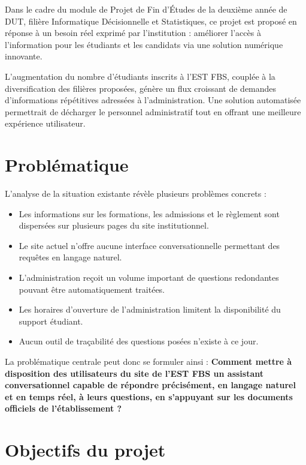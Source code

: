 \documentclass[12pt, a4paper, twoside]{report}
\begin{document}
Dans le cadre du module de Projet de Fin d'Études de la deuxième année de DUT, filière Informatique Décisionnelle et Statistiques, ce projet est proposé en réponse à un besoin réel exprimé par l'institution : améliorer l'accès à l'information pour les étudiants et les candidats via une solution numérique innovante.

L'augmentation du nombre d'étudiants inscrits à l'EST FBS, couplée à la diversification des filières proposées, génère un flux croissant de demandes d'informations répétitives adressées à l'administration. Une solution automatisée permettrait de décharger le personnel administratif tout en offrant une meilleure expérience utilisateur.

\section{Problématique}

L'analyse de la situation existante révèle plusieurs problèmes concrets :

\begin{infobox}
\begin{itemize}
  \item Les informations sur les formations, les admissions et le règlement sont dispersées sur plusieurs pages du site institutionnel.
  \item Le site actuel n'offre aucune interface conversationnelle permettant des requêtes en langage naturel.
  \item L'administration reçoit un volume important de questions redondantes pouvant être automatiquement traitées.
  \item Les horaires d'ouverture de l'administration limitent la disponibilité du support étudiant.
  \item Aucun outil de traçabilité des questions posées n'existe à ce jour.
\end{itemize}
\end{infobox}

La problématique centrale peut donc se formuler ainsi : \textbf{Comment mettre à disposition des utilisateurs du site de l'EST FBS un assistant conversationnel capable de répondre précisément, en langage naturel et en temps réel, à leurs questions, en s'appuyant sur les documents officiels de l'établissement ?}

\section{Objectifs du projet}
\end{document}
